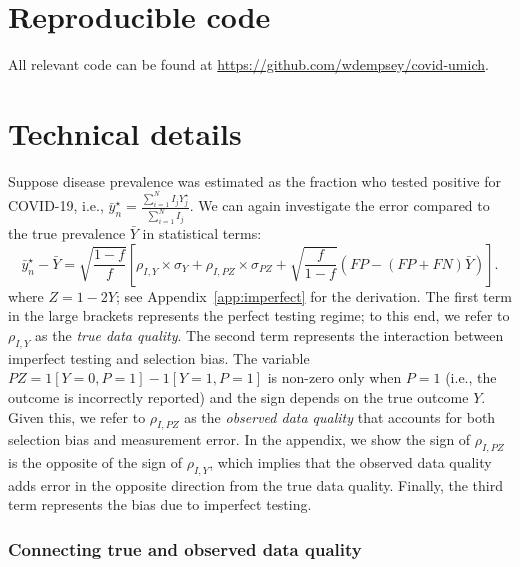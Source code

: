 \documentclass[12pt]{amsart}
\numberwithin{equation}{section}
\theoremstyle{plain}
\begin{document}



\newpage
\appendix

\section{Reproducible code}

All relevant code can be found at \url{https://github.com/wdempsey/covid-umich}.

\section{Technical details}

Suppose disease prevalence was estimated as the fraction who tested positive for COVID-19, i.e., $\bar y_n^\star = \frac{\sum_{i=1}^N I_j Y_j^\star}{\sum_{i=1}^N I_j}$.  We can again investigate the error compared to the true prevalence $\bar Y$ in statistical terms:
$$
\bar y_n^\star - \bar Y = \sqrt{\frac{1-f}{f}} \left[ \rho_{I,Y} \times \sigma_Y + \rho_{I,PZ} \times \sigma_{PZ} + \sqrt{\frac{f}{1-f}}  \left( FP - (FP+FN) \bar Y \right) \right] .
$$
where $Z = 1-2Y$; see Appendix~\ref{app:imperfect} for the derivation. The first term in the large brackets represents the perfect testing regime; to this end, we refer to $\rho_{I,Y}$ as the \emph{true data quality}.  The second term represents the interaction between imperfect testing and selection bias. The variable $PZ = 1[Y=0,P=1] - 1[Y=1, P=1]$ is non-zero only when $P=1$ (i.e., the outcome is incorrectly reported) and the sign depends on the true outcome $Y$.  Given this, we refer to $\rho_{I,PZ}$ as the \emph{observed data quality} that accounts for both selection bias and measurement error.  In the appendix, we show the sign of $\rho_{I,PZ}$ is the opposite of the sign of $\rho_{I,Y}$, which implies that the observed data quality adds error in the opposite direction from the true data quality.  Finally, the third term represents the bias due to imperfect testing.

\subsubsection{Connecting true and observed data quality}
\end{document}
